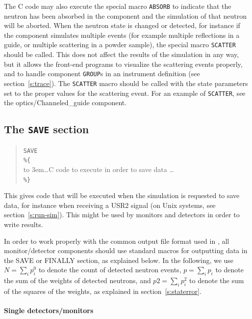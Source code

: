 The C code may also execute the special macro \texttt{ABSORB} to indicate
that the neutron has been absorbed in the component and the simulation of
that neutron will be aborted. When the neutron state is changed or detected, for
instance if the component simulates multiple events (for example multiple
reflections in a guide, or multiple scattering in a powder sample), the
special macro \texttt{SCATTER} should be called. This does not affect the
results of the simulation in any way, but it allows the front-end
programs to visualize the scattering events properly, and to handle
component \texttt{GROUP}s in an instrument definition (see
section~\ref{s:trace}). The \texttt{SCATTER} macro should be called with
the state parameters set to the proper values for the scattering event.
For an example of \texttt{SCATTER}, see the optics/Channeled\_guide
component. 


\subsection{The \texttt{SAVE} section}
\label{s:comp-save}

\begin{quote}
  \texttt{SAVE} \\
  \verb|%{| \\
  \hbox to 3em{}\ldots C code to execute in order to save data \ldots \\
  \verb|%}|
\end{quote}
This gives code that will be executed when the simulation is requested to save data, for instance when receiving a USR2 signal (on Unix systems, see section~\ref{s:run-sim}).
This might be used by monitors and detectors in order to write results.

In order to work properly with the common output file format used in
\MCS, all monitor/detector components should use standard macros for
outputting data in the SAVE or FINALLY section, as explained below. In the
following, we use $N = \sum_i p_i^0$ to denote the count of detected
neutron events, $p = \sum_i p_i$ to denote the sum of the weights of
detected neutrons, and $\textit{p2} = \sum_i p_i^2$ to denote the sum of
the squares of the weights, as explained in section~\ref{s:staterror}.

\paragraph{Single detectors/monitors}
\label{s:DETECTOR_OUT}

